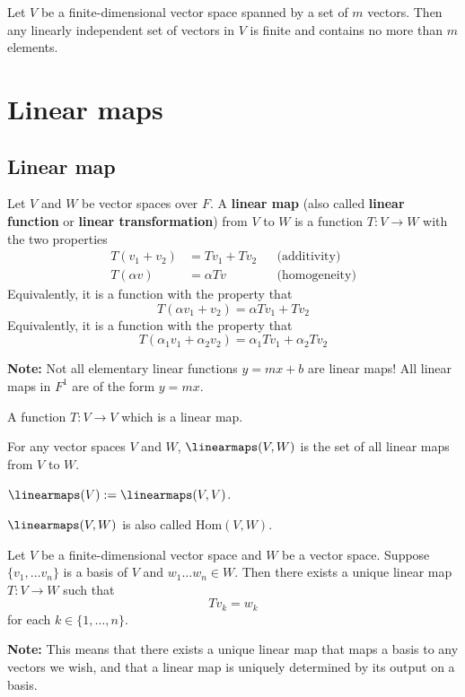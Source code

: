 \begin{theorem}
  Let $V$ be a finite-dimensional vector space spanned by a set of $m$ vectors. Then any linearly independent set of vectors in $V$ is finite and contains no more than $m$ elements.
\end{theorem}

\section{Linear maps}

\subsection{Linear map}

\begin{definition}
  Let $V$ and $W$ be vector spaces over $F$. A \textbf{linear map} (also called \textbf{linear function} or \textbf{linear transformation}) from $V$ to $W$ is a function $T : V \to W$ with the two properties
  \begin{align*}
    T(v_1 + v_2) &= Tv_1 + Tv_2 && \text{(additivity)} \\
    T(\alpha v) &= \alpha Tv && \text{(homogeneity)}
  \end{align*}
  Equivalently, it is a function with the property that 
  \[
    T(\alpha v_1 + v_2) = \alpha T v_1 + T v_2
  \]  
  Equivalently, it is a function with the property that
  \[
    T(\alpha_1 v_1 + \alpha_2 v_2) = \alpha_1 T v_1 + \alpha_2 T v_2
  \]
\end{definition}

\textbf{Note:} Not all elementary linear functions $y = mx + b$ are linear maps! All linear maps in $F^1$ are of the form $y = mx$.

\begin{definition} A function $T : V \to V$ which is a linear map.
\end{definition}

\begin{definition}[$\linearmaps$]
  For any vector spaces $V$ and $W$, $\linearmaps(V,W)$ is the set of all linear maps from $V$ to $W$.

  $\linearmaps(V) := \linearmaps(V,V)$.

  $\linearmaps(V,W)$ is also called $\text{Hom}(V,W)$.
\end{definition}

\begin{namedlemma}
  Let $V$ be a finite-dimensional vector space and $W$ be a vector space. Suppose $\{ v_1, \ldots v_n \}$ is a basis of $V$ and $w_1 \ldots w_n \in W$. Then there exists a unique linear map $T : V \to W$ such that
  \[
    Tv_k = w_k
  \]
  for each $k \in \{1, \ldots, n\}$.

  \textbf{Note:} This means that there exists a unique linear map that maps a basis to any vectors we wish, and that a linear map is uniquely determined by its output on a basis.
\end{namedlemma}

